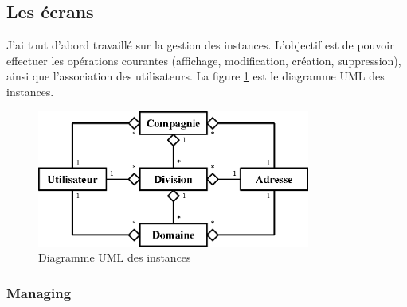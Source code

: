
\subsection{Les écrans}

J'ai tout d'abord travaillé sur la gestion des instances.
L'objectif est de pouvoir effectuer les opérations courantes (affichage, modification, création, suppression), ainsi que l'association des utilisateurs.
La figure \ref{instances_UML} est le diagramme UML des instances.
\begin{figure}[!h]
	\center
	\includegraphics[width=0.8\textwidth]{img/instances_UML.png}
	\caption{Diagramme UML des instances}
	\label{instances_UML}
\end{figure}


\subsubsection{Managing}


